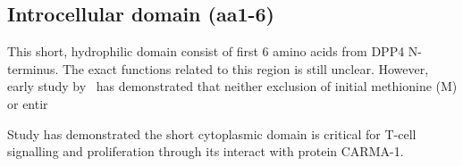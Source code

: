 \subsection{Introcellular domain (aa1-6)}

This short, hydrophilic domain consist of first 6 amino acids from DPP4 N-terminus. The exact functions related to this region is still unclear. However, early study by~\citet{Hong1990} has demonstrated that neither exclusion of initial methionine (M) or entir

Study has demonstrated the short cytoplasmic domain is critical for T-cell signalling and proliferation through its interact with protein CARMA-1. \cite{Ohnuma_2007}